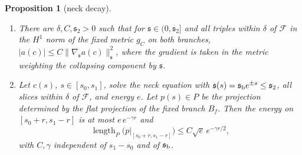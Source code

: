 \documentclass[11pt]{amsart}
\newtheorem{proposition}[theorem]{Proposition}
\theoremstyle{definition}
\theoremstyle{remark}
\theoremstyle{plain}
\numberwithin{equation}{section}
\newcommand{\cF}{\mathcal{F}}
\begin{document}
\begin{proposition}[neck decay]\label{prop:neck-decay}
\begin{enumerate}[label=(\roman*)]
\item There are $\delta,C,{\mathfrak s}_2>0$ such that for ${\mathfrak s}\in(0,{\mathfrak s}_2]$
  and all triples within $\delta$ of $\cF$ in the $H^1$ norm of the fixed metric $g_C$ on
  both branches,
  $|a(c)|\le C\|\nabla_{\mathfrak s} a(c)\|_{\mathfrak s}^2$, where the gradient is taken
  in the metric weighting the collapsing component by ${\mathfrak s}$.
\item Let $c(s)$, $s\in[s_0,s_1]$, solve the neck equation with
  ${\mathfrak s}(s)={\mathfrak s}_{\rm b}e^{\pm s}\le{\mathfrak s}_2$, all slices within $\delta$ of
  $\cF$, and energy $e$. Let $p(s)\in P$ be the projection determined by
  the flat projection of the fixed branch $B_f$. Then the energy on
  $[s_0+r,s_1-r]$ is at most $e\,e^{-\gamma r}$ and
  \[
  \operatorname{length}_P\bigl(p|_{[s_0+r,s_1-r]}\bigr)\le C\sqrt e\,e^{-\gamma r/2},
  \]
  with $C,\gamma$ independent of $s_1-s_0$ and of ${\mathfrak s}_{\rm b}$.
\end{enumerate}
\end{proposition}
\end{document}

